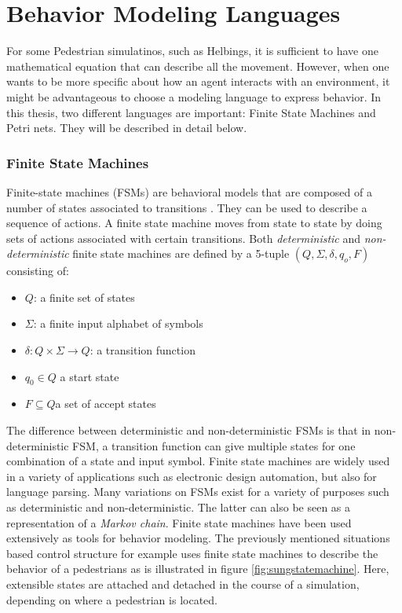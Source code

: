 \documentclass[11pt, a4paper]{book}
\begin{document}
\section{Behavior Modeling Languages}
For some Pedestrian simulatinos, such as Helbings, it is sufficient to have one mathematical equation that can describe all the movement. However, when one wants to be more specific about how an agent interacts with an environment, it might be advantageous to choose a modeling language to express behavior. In this thesis, two different languages are important: Finite State Machines and Petri nets. They will be described in detail below.

\subsubsection{Finite State Machines}
\label{sec:finitestatemachines}
Finite-state machines (FSMs) are behavioral models that are composed of a number of states associated to transitions \cite{gill1962introduction}. They can be used to describe a sequence of actions. A finite state machine moves from state to state by doing sets of actions associated with certain transitions.
Both \emph{deterministic} and \emph{non-deterministic} finite state machines are defined by a 5-tuple $(Q, \Sigma, \delta, q_o, F)$ consisting of:
\begin{itemize}
\item $Q$: a finite set of states
\item $\Sigma$: a finite input alphabet of symbols
\item $\delta : Q \times \Sigma \rightarrow Q$: a transition function 
\item $q_0 \in Q$ a start state 
\item $F \subseteq Q$a set of accept states 
\end{itemize}
The difference between deterministic and non-deterministic FSMs is that in non-deterministic FSM, a transition function can give multiple states for one combination of a state and input symbol.
Finite state machines are widely used in a variety of applications such as electronic design automation, but also for language parsing. Many variations on FSMs exist for a variety of purposes such as deterministic and non-deterministic. The latter can also be seen as a representation of a \emph{Markov chain}. Finite state machines have been used extensively as tools for behavior modeling. The previously mentioned situations based control structure for example uses finite state machines to describe the behavior of a pedestrians as is illustrated in figure \ref{fig:sungstatemachine}. Here, extensible states are attached and detached in the course of a simulation, depending on where a pedestrian is located.
\end{document}

